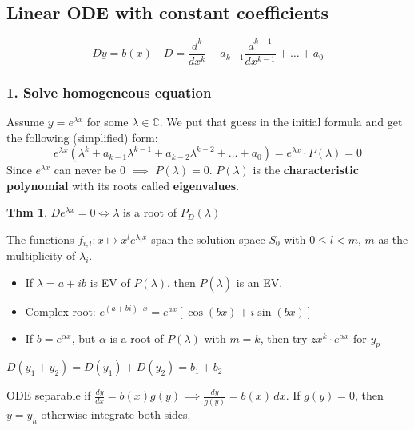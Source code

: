 \documentclass[a4paper, 10pt]{article}
\theoremstyle{definition}
\newtheorem*{theorem}{Thm}
\newcommand{\C}{\mathbb{C}}
\begin{document}
\subsection{Linear ODE with constant coefficients}
\[Dy = b(x) \quad D = \frac{d^k}{dx^k} + a_{k - 1} \frac{d^{k-1}}{dx^{k-1}} + \ldots + a_0\]

\subsubsection*{1. Solve homogeneous equation}
Assume \(y = e^{\lambda x}\) for some \(\lambda \in \C\). We put that guess in the initial formula and get the following (simplified) form:
\[e^{\lambda x}(\lambda^k + a_{k-1}\lambda^{k-1} + a_{k-2}\lambda^{k-2} + \ldots + a_0) = e^{\lambda x} \cdot P(\lambda) = 0\]
Since \(e^{\lambda x}\) can never be \(0\) \(\implies\) \(P(\lambda) = 0\). \(P(\lambda)\) is the \textbf{characteristic polynomial} with its roots called \textbf{eigenvalues}.

\begin{theorem}
    \(D e^{\lambda x} = 0 \iff \lambda\) is a root of \(P_D(\lambda)\)
\end{theorem}

\begin{note*}[Solutions]
    The functions \(f_{i, l}: x \mapsto x^l e^{\lambda_i x}\) span the solution space \(S_0\) with \(0 \leq l < m\), \(m\) as the multiplicity of \(\lambda_i\).

    \begin{itemize}
        \item If \(\lambda = a + ib\) is EV of \(P(\lambda)\), then \(P(\overline{\lambda})\) is an EV.
        \item Complex root: \(e^{(a + bi) \cdot x} = e^{ax}[\cos(bx) + i \sin(bx)]\)
        \item If \(b = e^{\alpha x}\), but \(\alpha\) is a root of \(P(\lambda)\) with \(m = k\), then try \(zx^k \cdot e^{\alpha x}\) for \(y_p\)
    \end{itemize}
\end{note*}

\begin{ntheorem*}
    \(D(y_1 + y_2) = D(y_1) + D(y_2) = b_1 + b_2\)
\end{ntheorem*}

\begin{ntheorem*}
    ODE separable if \(\frac{dy}{dx} = b(x)g(y) \implies \frac{dy}{g(y)} = b(x) \,dx\). If \(g(y) = 0\), then \(y = y_h\) otherwise integrate both sides.
\end{ntheorem*}
\end{document}
